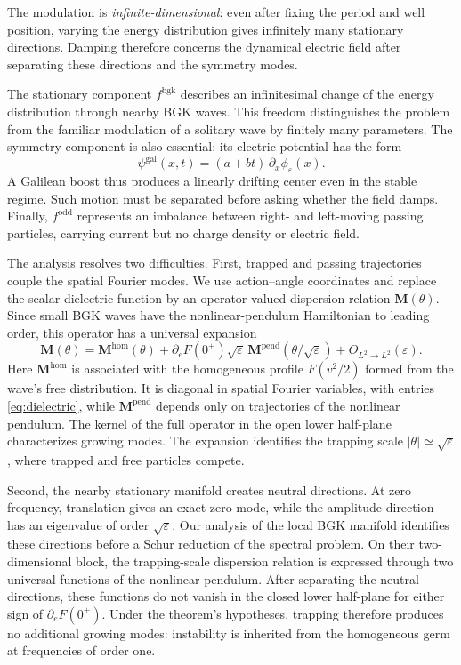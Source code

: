 \documentclass[10pt,reqno]{amsart}
\begin{document}
The modulation is \emph{infinite-dimensional}: even after fixing the period and well position, varying the energy distribution gives infinitely many stationary directions. Damping therefore concerns the dynamical electric field after separating these directions and the symmetry modes.

The stationary component $f^{\mathrm{bgk}}$ describes an infinitesimal change of the energy distribution through nearby BGK waves. This freedom distinguishes the problem from the familiar modulation of a solitary wave by finitely many parameters. The symmetry component is also essential: its electric potential has the form
\[
\psi^{\mathrm{gal}}(x,t)=(a+bt)\,\partial_x\phi_\varepsilon(x).
\]
A Galilean boost thus produces a linearly drifting center even in the stable regime. Such motion must be separated before asking whether the field damps. Finally, $f^{\mathrm{odd}}$ represents an imbalance between right- and left-moving passing particles, carrying current but no charge density or electric field.

The analysis resolves two difficulties. First, trapped and passing trajectories couple the spatial Fourier modes. We use action--angle coordinates and replace the scalar dielectric function by an operator-valued dispersion relation $\mathbf M(\theta)$. Since small BGK waves have the nonlinear-pendulum Hamiltonian to leading order, this operator has a universal expansion
\[
\mathbf M(\theta)=\mathbf M^{\mathrm{hom}}(\theta)
+\partial_eF(0^+)\sqrt{\varepsilon}\,
\mathbf M^{\mathrm{pend}}(\theta/\sqrt{\varepsilon})
+O_{L^2\to L^2}(\varepsilon).
\]
Here $\mathbf M^{\mathrm{hom}}$ is associated with the homogeneous profile $F(v^2/2)$ formed from the wave's free distribution. It is diagonal in spatial Fourier variables, with entries \eqref{eq:dielectric}, while $\mathbf M^{\mathrm{pend}}$ depends only on trajectories of the nonlinear pendulum. The kernel of the full operator in the open lower half-plane characterizes growing modes. The expansion identifies the trapping scale $|\theta|\simeq\sqrt{\varepsilon}$, where trapped and free particles compete.

Second, the nearby stationary manifold creates neutral directions. At zero frequency, translation gives an exact zero mode, while the amplitude direction has an eigenvalue of order $\sqrt{\varepsilon}$. Our analysis of the local BGK manifold identifies these directions before a Schur reduction of the spectral problem. On their two-dimensional block, the trapping-scale dispersion relation is expressed through two universal functions of the nonlinear pendulum. After separating the neutral directions, these functions do not vanish in the closed lower half-plane for either sign of $\partial_eF(0^+)$. Under the theorem's hypotheses, trapping therefore produces no additional growing modes: instability is inherited from the homogeneous germ at frequencies of order one.
\end{document}
